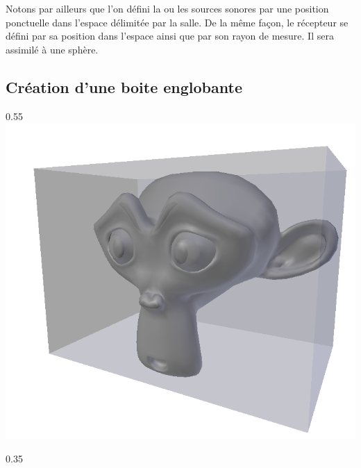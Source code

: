 Notons par ailleurs que l'on défini la ou les sources sonores par une position ponctuelle dans l'espace délimitée par la salle. De la même façon, le récepteur se défini par sa position dans l'espace ainsi que par son rayon de mesure. Il sera assimilé à une sphère.

\subsection{Création d'une boite englobante}

\begin{figureth}
	\begin{subfigureth}{0.55\textwidth}
		\includegraphics[width=\linewidth]{images/boiteenglobante}
		\label{boiteenglobante}
	\end{subfigureth}
	\qquad
	\begin{subfigureth}{0.35\textwidth}

\end{subfigureth}
\end{figureth}
